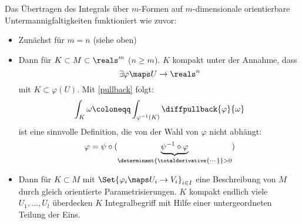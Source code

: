 \begin{bemerkung}
  Das Übertragen des Integrals über \( m \)-Formen auf \( m \)-dimensionale orientierbare Untermannigfaltigkeiten funktioniert wie zuvor:
  \begin{itemize}
      \item Zunächst für \( m=n \) (siehe oben)
      \item Dann für \( K\subset M\subset\reals^m \) (\( n\geq m \)).
      \( K \) kompakt unter der Annahme, dass 
      \begin{equation*}
          \exists \varphi\maps U\to \reals^n
      \end{equation*}
      mit \( K\subset \varphi(U) \). Mit \ref{pullback} folgt:
      \begin{equation*}
          \int_K \omega\coloneqq \int_{\varphi^{-1}(K)}\diffpullback{\varphi}{\omega}
      \end{equation*}
      ist eine sinnvolle Definition, die von der Wahl von \( \varphi \) nicht abhängt:
      \begin{equation*}
          \varphi=\psi\circ(\underbrace{\psi^{-1}\circ\varphi}_{\determinant{\totalderivative{\dotsb }}>0})
      \end{equation*}
      \item Dann für \( K\subset M \) mit \( \Set{\varphi_i\maps U_i\to V_i}_{i\in I} \) eine Beschreibung von \( M \) durch gleich orientierte Parametrisierungen.
      \( K \) kompakt \timplies endlich viele \( U_1,\dotsc ,U_l \) überdecken \( K \) \timplies Integralbegriff mit Hilfe einer untergeordneten Teilung der Eins.
  \end{itemize}
\end{bemerkung}

